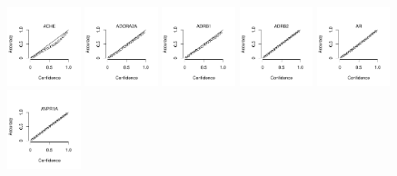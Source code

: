 \documentclass[utf8]{frontiers_suppmat} %
\begin{document}
\begin{figure}[h!]
    \vspace*{-15pt} %
    \includegraphics[width=0.19\textwidth]{figures/calibration_plots/ache_calib.pdf}
    \includegraphics[width=0.19\textwidth]{figures/calibration_plots/adora2a_calib.pdf}
    \includegraphics[width=0.19\textwidth]{figures/calibration_plots/adrb1_calib.pdf}
    \includegraphics[width=0.19\textwidth]{figures/calibration_plots/adrb2_calib.pdf}
    \includegraphics[width=0.19\textwidth]{figures/calibration_plots/ar_calib.pdf}
    \vspace*{-15pt} %
    \includegraphics[width=0.19\textwidth]{figures/calibration_plots/avpr1a_calib.pdf}

\end{figure}
\end{document}
